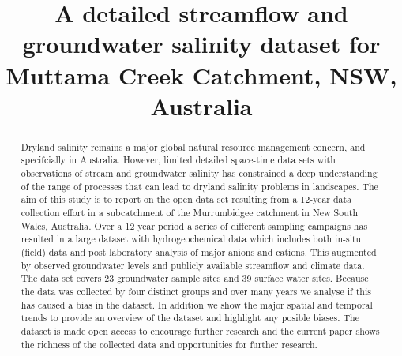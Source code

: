 \documentclass[, manuscript]{copernicus}
\begin{document}
\title{A detailed streamflow and groundwater salinity dataset for
Muttama Creek Catchment, NSW, Australia}











\received{}
\pubdiscuss{} %
\revised{}
\accepted{}
\published{}




\maketitle


\begin{abstract}
Dryland salinity remains a major global natural resource management
concern, and specifcially in Australia. However, limited detailed
space-time data sets with observations of stream and groundwater
salinity has constrained a deep understanding of the range of processes
that can lead to dryland salinity problems in landscapes. The aim of
this study is to report on the open data set resulting from a 12-year
data collection effort in a subcatchment of the Murrumbidgee catchment
in New South Wales, Australia. Over a 12 year period a series of
different sampling campaigns has resulted in a large dataset with
hydrogeochemical data which includes both in-situ (field) data and post
laboratory analysis of major anions and cations. This augmented by
observed groundwater levels and publicly available streamflow and
climate data. The data set covers 23 groundwater sample sites and 39
surface water sites. Because the data was collected by four distinct
groups and over many years we analyse if this has caused a bias in the
dataset. In addition we show the major spatial and temporal trends to
provide an overview of the dataset and highlight any posible biases. The
dataset is made open access to encourage further research and the
current paper shows the richness of the collected data and opportunities
for further research.
\end{abstract}
\end{document}
